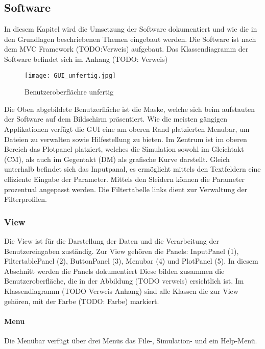 
\subsection{Software} \label{subsec:software}

In diesem Kapitel wird die Umsetzung der Software dokumentiert und wie die in den Grundlagen beschriebenen Themen eingebaut werden. Die Software ist nach dem MVC Framework (TODO:Verweis) aufgebaut. Das Klassendiagramm der Software befindet sich im Anhang (TODO: Verweis)
\begin{figure}[H]
		\centering
		\texttt{[image: GUI\_unfertig.jpg]}
		\label{fig:gui}
		\caption{Benutzeroberflächre unfertig}
\end{figure}

Die Oben abgebildete Benutzerfläche ist die Maske, welche sich beim aufstauten der Software auf dem Bildschirm präsentiert.
Wie die  meisten gängigen Applikationen verfügt die GUI eine am oberen Rand platzierten Menubar, um Dateien zu verwalten sowie Hilfestellung zu bieten.
Im Zentrum ist im oberen Bereich das Plotpanel platziert, welches die Simulation sowohl im Gleichtakt (CM), als auch im Gegentakt (DM) als grafische Kurve darstellt.
Gleich unterhalb befindet sich das Inputpanal, es ermöglicht mittels den Textfeldern eine  effiziente Eingabe der  Parameter. Mittels den Sleidern können die Parameter prozentual angepasst werden.
Die Filtertabelle links dient zur Verwaltung der Filterprofilen.


\subsubsection{View}\label{subsubsec:view}

Die View ist für die Darstellung der Daten und die Verarbeitung der Benutzereingaben zuständig. Zur View gehören die Panels: InputPanel (1), FiltertablePanel (2), ButtonPanel (3), Menubar (4) und PlotPanel (5). In diesem Abschnitt werden die Panels dokumentiert Diese bilden zusammen die Benutzeroberfläche, die in der Abbildung (TODO verweis) ersichtlich ist. Im Klassendiagramm (TODO Verweis Anhang) sind alle Klassen die zur View gehören, mit der Farbe (TODO: Farbe) markiert.

\paragraph{Menu} \label{par:menu}

Die Menübar verfügt über drei Menüs das File-,  Simulation- und ein Help-Menü.

